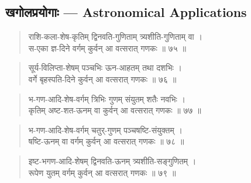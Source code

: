 \documentclass[11pt,a4paper]{article}
\newcommand{\dev}[1]{{\devanagarifont #1}}
\newenvironment{shloka}{\begin{verse}\devanagarifont\large}{\end{verse}}
\begin{document}
\newpage

\subsection*{\dev{खगोलप्रयोगाः — Astronomical Applications}}

\vspace{0.3cm}

\begin{shloka}
राशि-कला-शेष-कृतिम् द्विनवति-गुणिताम् त्र्यशीति-गुणिताम् वा ।\\
स-एका ज्ञ-दिने वर्गम् कुर्वन् आ वत्सरात् गणकः ॥ ७५ ॥
\end{shloka}

\vspace{0.3cm}

\begin{shloka}
सूर्य-विलिप्ता-शेषम् पञ्चभिः ऊन-आहतम् तथा दशभिः ।\\
वर्गे बृहस्पति-दिने कुर्वन् आ वत्सरात् गणकः ॥ ७६ ॥
\end{shloka}

\vspace{0.3cm}

\begin{shloka}
भ-गण-आदि-शेष-वर्गम् त्रिभिः गुणम् संयुतम् शतैः नवभिः ।\\
कृतिम् अष्ट-शत-ऊनम् वा कुर्वन् आ वत्सरात् गणकः ॥ ७७ ॥
\end{shloka}

\vspace{0.3cm}

\begin{shloka}
भ-गण-आदि-शेष-वर्गम् चतुर्-गुणम् पञ्चषष्टि-संयुक्तम् ।\\
षष्टि-ऊनम् वा वर्गम् कुर्वन् आ वत्सरात् गणकः ॥ ७८ ॥
\end{shloka}

\vspace{0.3cm}

\begin{shloka}
इष्ट-भगण-आदि-शेषम् द्विनवति-ऊनम् त्र्यशीति-सङ्गुणितम् ।\\
रूपेण युतम् वर्गम् कुर्वन् आ वत्सरात् गणकः ॥ ७९ ॥
\end{shloka}

\vspace{0.3cm}
\end{document}
